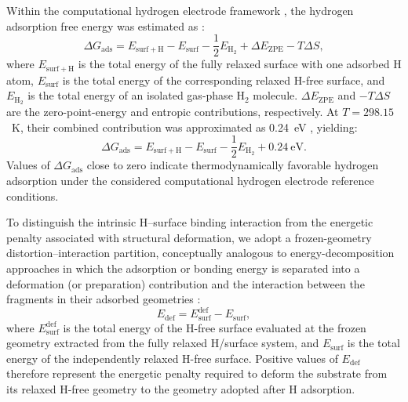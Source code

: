 \documentclass[journal=jacsat,manuscript=article]{achemso}
\begin{document}
Within the computational hydrogen electrode framework \cite{NORSKOV2004}, the hydrogen adsorption free energy was estimated as \cite{Liao2022,Sholl2009DensityTheory,Martin2004ElectronicMethods}:
\begin{equation}
  \Delta G_{\mathrm{ads}}
  =
  E_{\mathrm{surf+H}}
  -
  E_{\mathrm{surf}}
  -
  \frac{1}{2}E_{\mathrm{H_2}}
  +
  \Delta E_{\mathrm{ZPE}}
  -
  T\Delta S,
  \label{eq:Gads}
\end{equation}
where $E_{\mathrm{surf+H}}$ is the total energy of the fully relaxed surface with one adsorbed H atom, $E_{\mathrm{surf}}$ is the total energy of the corresponding relaxed H-free surface, and $E_{\mathrm{H_2}}$ is the total energy of an isolated gas-phase H$_2$ molecule. $\Delta E_{\mathrm{ZPE}}$ and $-T\Delta S$ are the zero-point-energy and entropic contributions, respectively. At $T=298.15$~K, their combined contribution was approximated as 0.24~eV \cite{Norskov_2005}, yielding:
\begin{equation}
  \Delta G_{\mathrm{ads}}
  =
  E_{\mathrm{surf+H}}
  -
  E_{\mathrm{surf}}
  -
  \frac{1}{2}E_{\mathrm{H_2}}
  +
  0.24~\mathrm{eV}.
  \label{eq:Gads_approx}
\end{equation}
Values of $\Delta G_{\mathrm{ads}}$ close to zero indicate thermodynamically favorable hydrogen adsorption under the considered computational hydrogen electrode reference conditions.

To distinguish the intrinsic H--surface binding interaction from the
energetic penalty associated with structural deformation, we adopt a
frozen-geometry distortion--interaction partition, conceptually
analogous to energy-decomposition approaches in which the adsorption
or bonding energy is separated into a deformation (or preparation)
contribution and the interaction between the fragments in their
adsorbed geometries \cite{Raupach2015,Staub2019,Clabaut2020}:
\begin{equation}
  E_{\mathrm{def}}=E_{\mathrm{surf}}^{\mathrm{def}}-E_{\mathrm{surf}},
  \label{eq:Edef}
\end{equation}
where $E_{\mathrm{surf}}^{\mathrm{def}}$ is the total energy of the H-free surface evaluated at the frozen geometry extracted from the fully relaxed H/surface system, and $E_{\mathrm{surf}}$ is the total energy of the independently relaxed H-free surface. Positive values of $E_{\mathrm{def}}$ therefore represent the energetic penalty required to deform the substrate from its relaxed H-free geometry to the geometry adopted after H adsorption.
\end{document}
